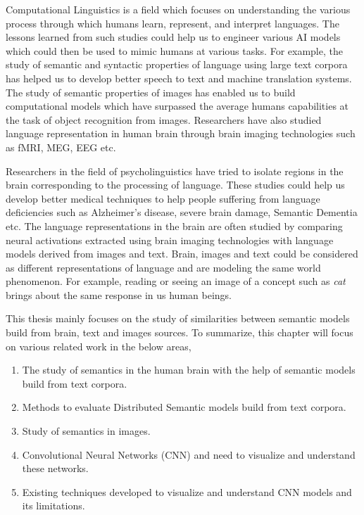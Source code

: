 \label{chapter:problem}
\newlength{\savedunitlength}
\setlength{\unitlength}{2em}


Computational Linguistics is a field which focuses on understanding the various process through which humans learn, represent, and interpret languages. The lessons learned from such studies could help us to engineer various AI models which could then be used to mimic humans at various tasks. For example, the study of semantic and syntactic properties of language using large text corpora has helped us to develop better speech to text and machine translation systems. The study of semantic properties of images has enabled us to build computational models which have surpassed the average humans capabilities at the task of object recognition from images. Researchers have also studied language representation in human brain through brain imaging technologies such as fMRI, MEG, EEG etc. 

Researchers in the field of psycholinguistics have tried to isolate regions in the brain corresponding to the processing of language. These studies could help us develop better medical techniques to help people suffering from language deficiencies such as Alzheimer’s disease, severe brain damage, Semantic Dementia etc. The language representations in the brain are often studied by comparing neural activations extracted using brain imaging technologies with language models derived from images and text. Brain, images and text could be considered as different representations of language and are modeling the same world phenomenon. For example, reading or seeing an image of a concept such as \textit{cat} brings about the same response in us human beings.

This thesis mainly focuses on the study of similarities between semantic models build from brain, text and images sources. To summarize, this chapter will focus on various related work in the below areas,

\begin{enumerate}
\item The study of semantics in the human brain with the help of semantic models build from text corpora.
\item Methods to evaluate Distributed Semantic models build from text corpora.
\item Study of semantics in images.   
\item Convolutional Neural Networks (CNN) and need to visualize and understand these networks.
\item Existing techniques developed to visualize and understand CNN models and its limitations.
\end{enumerate}

